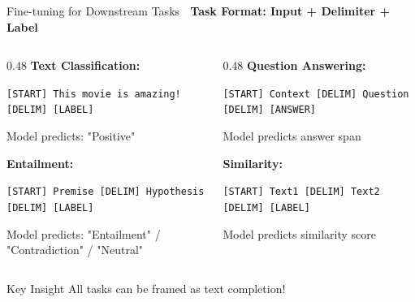 \documentclass[aspectratio=169]{beamer}
\begin{document}
\begin{frame}{Fine-tuning for Downstream Tasks 🎯}
    \textbf{Task Format: Input + Delimiter + Label}

    \vspace{0.3cm}

    \begin{columns}[T]
        \begin{column}{0.48\textwidth}
            \textbf{Text Classification:}

            \small
            \texttt{[START] This movie is amazing! [DELIM] [LABEL]}

            \vspace{0.15cm}
            Model predicts: "Positive"

            \vspace{0.15cm}

            \textbf{Entailment:}

            \small
            \texttt{[START] Premise [DELIM] Hypothesis [DELIM] [LABEL]}

            \vspace{0.15cm}
            Model predicts: "Entailment" / "Contradiction" / "Neutral"
        \end{column}

        \begin{column}{0.48\textwidth}
            \textbf{Question Answering:}

            \small
            \texttt{[START] Context [DELIM] Question [DELIM] [ANSWER]}

            \vspace{0.15cm}
            Model predicts answer span

            \vspace{0.15cm}

            \textbf{Similarity:}

            \small
            \texttt{[START] Text1 [DELIM] Text2 [DELIM] [LABEL]}

            \vspace{0.15cm}
            Model predicts similarity score
        \end{column}
    \end{columns}

    \vspace{0.3cm}

    \begin{alertblock}{Key Insight}
        All tasks can be framed as text completion! 🎯
    \end{alertblock}
\end{frame}
\end{document}
